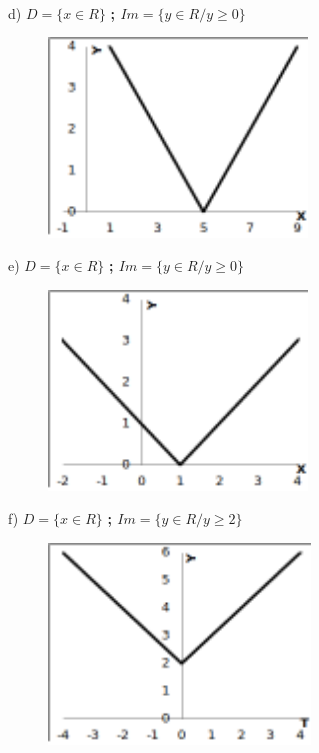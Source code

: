 \begin{respostas}{7}
~~

	d)  \( D= \{ x \in R \}  \) \textbf{; \( Im= \{ y \in R/y \geq 0 \}  \) }

	\begin{figure}[H]
		\begin{Center}
			\includegraphics[width=2.71in,height=2.09in]{capitulos/outras_funcoes/media/image89.pdf}
		\end{Center}
	\end{figure}

	e)  \( D= \{ x \in R \}  \) \textbf{; \( Im= \{ y \in R/y \geq 0 \}  \) }

	\begin{figure}[H]
		\begin{Center}
			\includegraphics[width=2.71in,height=2.09in]{capitulos/outras_funcoes/media/image90.pdf}
		\end{Center}
	\end{figure}

	f)  \( D= \{ x \in R \}  \) \textbf{; \( Im= \{ y \in R/y \geq 2 \}  \) }

	\begin{figure}[H]
		\begin{Center}
			\includegraphics[width=2.74in,height=2.11in]{capitulos/outras_funcoes/media/image91.pdf}
		\end{Center}
	\end{figure}


\end{respostas}
